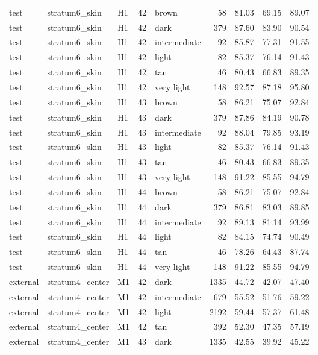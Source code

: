 \begin{tabular}{lllrlrrrr}
test & stratum6\_skin & H1 & 42 & brown & 58 & 81.03 & 69.15 & 89.07 \\
test & stratum6\_skin & H1 & 42 & dark & 379 & 87.60 & 83.90 & 90.54 \\
test & stratum6\_skin & H1 & 42 & intermediate & 92 & 85.87 & 77.31 & 91.55 \\
test & stratum6\_skin & H1 & 42 & light & 82 & 85.37 & 76.14 & 91.43 \\
test & stratum6\_skin & H1 & 42 & tan & 46 & 80.43 & 66.83 & 89.35 \\
test & stratum6\_skin & H1 & 42 & very light & 148 & 92.57 & 87.18 & 95.80 \\
test & stratum6\_skin & H1 & 43 & brown & 58 & 86.21 & 75.07 & 92.84 \\
test & stratum6\_skin & H1 & 43 & dark & 379 & 87.86 & 84.19 & 90.78 \\
test & stratum6\_skin & H1 & 43 & intermediate & 92 & 88.04 & 79.85 & 93.19 \\
test & stratum6\_skin & H1 & 43 & light & 82 & 85.37 & 76.14 & 91.43 \\
test & stratum6\_skin & H1 & 43 & tan & 46 & 80.43 & 66.83 & 89.35 \\
test & stratum6\_skin & H1 & 43 & very light & 148 & 91.22 & 85.55 & 94.79 \\
test & stratum6\_skin & H1 & 44 & brown & 58 & 86.21 & 75.07 & 92.84 \\
test & stratum6\_skin & H1 & 44 & dark & 379 & 86.81 & 83.03 & 89.85 \\
test & stratum6\_skin & H1 & 44 & intermediate & 92 & 89.13 & 81.14 & 93.99 \\
test & stratum6\_skin & H1 & 44 & light & 82 & 84.15 & 74.74 & 90.49 \\
test & stratum6\_skin & H1 & 44 & tan & 46 & 78.26 & 64.43 & 87.74 \\
test & stratum6\_skin & H1 & 44 & very light & 148 & 91.22 & 85.55 & 94.79 \\
external & stratum4\_center & M1 & 42 & dark & 1335 & 44.72 & 42.07 & 47.40 \\
external & stratum4\_center & M1 & 42 & intermediate & 679 & 55.52 & 51.76 & 59.22 \\
external & stratum4\_center & M1 & 42 & light & 2192 & 59.44 & 57.37 & 61.48 \\
external & stratum4\_center & M1 & 42 & tan & 392 & 52.30 & 47.35 & 57.19 \\
external & stratum4\_center & M1 & 43 & dark & 1335 & 42.55 & 39.92 & 45.22 \\

\end{tabular}
